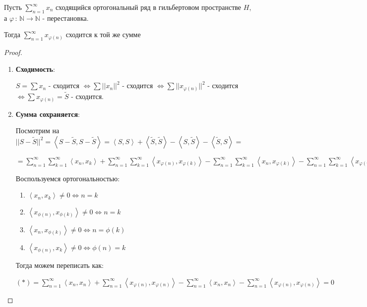 \begin{consequence}
    Пусть $\sum_{n = 1}^{\infty} x_n$ сходящийся ортогональный ряд в гильбертовом пространстве $H$, а $\varphi \, : \, \mathbb{N} \to \mathbb{N}$ - перестановка.
    
    Тогда $\sum_{n = 1}^\infty x_{\varphi(n)} $ сходится к той же сумме 
\end{consequence}

\begin{proof}
    \begin{enumerate}
        \item {
        \textbf{Сходимость}:

        $S = \sum x_n$ - сходится $\Longleftrightarrow \sum ||x_n||^2$ - сходится $\Longleftrightarrow \sum ||x_{\varphi(n)}||^2$ - сходится $\Longleftrightarrow \sum x_{\varphi(n)} = \tilde{S}$ - сходится.
        }
        \item {
        \textbf{Сумма сохраняется}:

        
        Посмотрим на $||S - \tilde{S}||^2 = \left <  S - \tilde{S}, S - \tilde{S} \right > = \left < S, S \right > + \left < \tilde{S}, \tilde{S} \right > - \left < S, \tilde{S} \right > - \left < \tilde{S}, S \right > = $
        
        $= \sum_{n = 1}^\infty \sum_{k = 1}^\infty \left < x_n, x_k \right > + \sum_{n = 1}^\infty \sum_{k = 1}^\infty \left < x_{\varphi(n)}, x_{\varphi(k)} \right > - \sum_{n = 1}^\infty \sum_{k = 1}^\infty \left < x_n, x_{\varphi(k)} \right > - \sum_{n = 1}^\infty \sum_{k = 1}^\infty \left < x_{\varphi(n)}, x_k \right > = (*)$

        Воспользуемся ортогональностью:

        \begin{enumerate}
            \item {
                $\left< x_n, x_k \right> \neq 0 \Leftrightarrow n = k$
            }
            \item {
                $\left< x_{\phi(n)}, x_{\phi(k)} \right> \neq 0 \Leftrightarrow n = k$
            }
            \item {
                $\left< x_n, x_{\phi(k)} \right> \neq 0 \Leftrightarrow n = \phi(k)$
            }
            \item {
                $\left< x_{\phi(n)}, x_k \right> \neq 0 \Leftrightarrow \phi(n) = k$
            }
        \end{enumerate}

        Тогда можем переписать как:
        
        $(*) = \sum_{n = 1}^\infty \left < x_n , x_n \right > + \sum_{n = 1}^\infty \left < x_{\varphi(n)}, x_{\varphi(n)} \right > - \sum_{n = 1}^\infty \left < x_n, x_n \right > - \sum_{n = 1}^\infty \left < x_{\varphi(n)}, x_{\varphi(n)} \right > = 0 $
        }
    \end{enumerate}
\end{proof}

